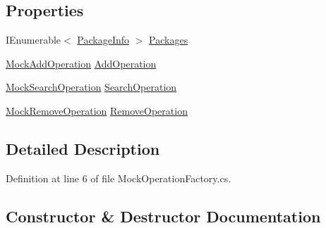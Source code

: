 \subsection*{Properties}
\begin{DoxyCompactItemize}
\item 
I\+Enumerable$<$ \mbox{\hyperlink{class_unity_editor_1_1_package_manager_1_1_u_i_1_1_package_info}{Package\+Info}} $>$ \mbox{\hyperlink{class_unity_editor_1_1_package_manager_1_1_u_i_1_1_tests_1_1_mock_operation_factory_ac5b0b5d8a6b7202e5f650bbd79e94836}{Packages}}
\item 
\mbox{\hyperlink{class_unity_editor_1_1_package_manager_1_1_u_i_1_1_tests_1_1_mock_add_operation}{Mock\+Add\+Operation}} \mbox{\hyperlink{class_unity_editor_1_1_package_manager_1_1_u_i_1_1_tests_1_1_mock_operation_factory_afbe73c35242df8c6e6fa2b1a7ac2f732}{Add\+Operation}}
\item 
\mbox{\hyperlink{class_unity_editor_1_1_package_manager_1_1_u_i_1_1_tests_1_1_mock_search_operation}{Mock\+Search\+Operation}} \mbox{\hyperlink{class_unity_editor_1_1_package_manager_1_1_u_i_1_1_tests_1_1_mock_operation_factory_a69850c9fb9da5cbb687083486d539e21}{Search\+Operation}}
\item 
\mbox{\hyperlink{class_unity_editor_1_1_package_manager_1_1_u_i_1_1_tests_1_1_mock_remove_operation}{Mock\+Remove\+Operation}} \mbox{\hyperlink{class_unity_editor_1_1_package_manager_1_1_u_i_1_1_tests_1_1_mock_operation_factory_a35237cef3f45a643e6faea7aa5671dc2}{Remove\+Operation}}
\end{DoxyCompactItemize}


\subsection{Detailed Description}


Definition at line 6 of file Mock\+Operation\+Factory.\+cs.



\subsection{Constructor \& Destructor Documentation}
\mbox{\label{class_unity_editor_1_1_package_manager_1_1_u_i_1_1_tests_1_1_mock_operation_factory_afbdf8caeca18b0dcb3b8669486cfde54}} 
